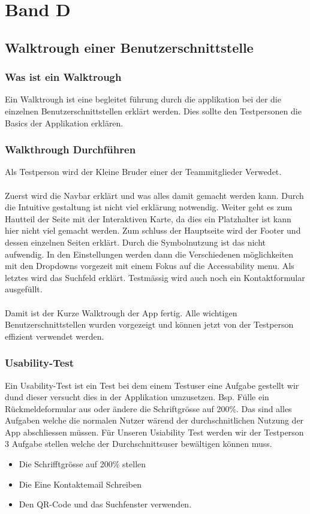 \documentclass[10pt]{article}
\newcounter{subsubsubsection}[subsubsection]
\begin{document}
	\section{Band D}
	\subsection {Walktrough einer Benutzerschnittstelle}
	\subsubsection{Was ist ein Walktrough}
	Ein Walktrough ist eine begleitet führung durch die applikation bei der die einzelnen Benutzerschnittstellen erklärt werden. Dies sollte den Testpersonen die Basics der Applikation erklären.
	\subsubsection{Walkthrough Durchführen}
	Als Testperson wird der Kleine Bruder einer der Teammitglieder Verwedet.\\\\
	Zuerst wird die Navbar erklärt und was alles damit gemacht werden kann. Durch die Intuitive gestaltung ist nicht viel erklärung notwendig. Weiter geht es zum Hautteil der Seite mit der Interaktiven Karte, da dies ein Platzhalter ist kann hier nicht viel gemacht werden. Zum schluss der Hauptseite wird der Footer und dessen einzelnen Seiten erklärt. Durch die Symbolnutzung ist das nicht aufwendig. In den Einstellungen werden dann die Verschiedenen möglichkeiten mit den Dropdowns vorgezeit mit einem Fokus auf die Accessability menu. Als letztes wird das Suchfeld erklärt. Testmässig wird auch noch ein Kontaktformular ausgefüllt.\\\\
	Damit ist der Kurze Walktrough der App fertig. Alle wichtigen Benutzerschnittstellen wurden vorgezeigt und können jetzt von der Testperson effizient verwendet werden.
	\subsubsection{Usability-Test}
	Ein Usability-Test ist ein Test bei dem einem Testuser eine Aufgabe gestellt wir dund dieser versucht dies in der Applikation umzusetzen. Bsp. Fülle ein Rückmeldeformular aus oder ändere die Schriftgrösse auf 200\%. Das sind alles Aufgaben welche die normalen Nutzer wärend der durchschnitlichen Nutzung der App abschliessen müssen.
	Für Unseren Usiability Test werden wir der Testperson 3 Aufgabe stellen welche der Durchschnittsuser bewältigen können muss.
	\begin{itemize}
		\item Die Schrifftgrösse auf 200\% stellen
		\item Die Eine Kontaktemail Schreiben
		\item Den QR-Code und das Suchfenster verwenden.
	\end{itemize}
\end{document}
